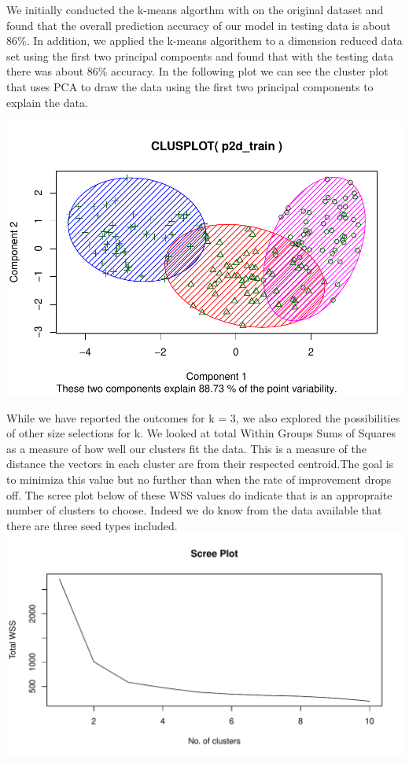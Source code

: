 \documentclass[]{article}
\begin{document}
We initially conducted the k-means algorthm with on the original dataset
and found that the overall prediction accuracy of our model in testing
data is about 86\%. In addition, we applied the k-means algorithem to a
dimension reduced data set using the first two principal compoents and
found that with the testing data there was about 86\% accuracy. In the
following plot we can see the cluster plot that uses PCA to draw the
data using the first two principal components to explain the data.

\includegraphics{Project2_files/figure-latex/unnamed-chunk-3-1.pdf}

While we have reported the outcomes for k = 3, we also explored the
possibilities of other size selections for k. We looked at total Within
Groups Sums of Squares as a measure of how well our clusters fit the
data. This is a measure of the distance the vectors in each cluster are
from their respected centroid.The goal is to minimiza this value but no
further than when the rate of improvement drops off. The scree plot
below of these WSS values do indicate that is an appropraite number of
clusters to choose. Indeed we do know from the data available that there
are three seed types included.\\
\includegraphics{Project2_files/figure-latex/unnamed-chunk-4-1.pdf}
\end{document}
